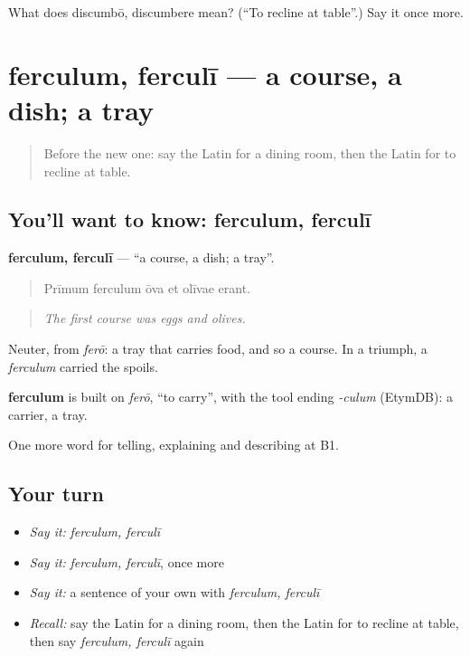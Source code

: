 \begin{tcolorbox}[breakable,colback=teal!4,colframe=teal!35!black,title={Before you move on}]
What does discumbō, discumbere mean? (\textquotedblleft{}To recline at table\textquotedblright{}.) Say it once more.
\end{tcolorbox}
\section[ferculum, ferculī]{ferculum, ferculī — a course, a dish; a tray}

\label{lesson:LA-C356-ferculum}



\begin{quote}
Before the new one: say the Latin for a dining room, then the Latin for to recline at table.
\end{quote}

\subsection*{You'll want to know: ferculum, ferculī}
\textbf{ferculum, ferculī} — \textquotedblleft{}a course, a dish; a tray\textquotedblright{}.

\begin{quote}
Prīmum ferculum ōva et olīvae erant.
\end{quote}

\begin{quote}
\emph{The first course was eggs and olives.}
\end{quote}

Neuter, from \emph{ferō}: a tray that carries food, and so a course. In a triumph, a \emph{ferculum} carried the spoils.

\begin{cousinweb}
\textbf{ferculum} is built on \emph{ferō}, \textquotedblleft{}to carry\textquotedblright{}, with the tool ending \emph{-culum} (EtymDB): a carrier, a tray.
\end{cousinweb}

\begin{grammarlens}[title={What you've built}]
One more word for telling, explaining and describing at B1.
\end{grammarlens}

\subsection*{Your turn}
\begin{itemize}
\raggedright
  \item \emph{Say it:} \emph{ferculum, ferculī}
  \item \emph{Say it:} \emph{ferculum, ferculī}, once more
  \item \emph{Say it:} a sentence of your own with \emph{ferculum, ferculī}
  \item \emph{Recall:} say the Latin for a dining room, then the Latin for to recline at table, then say \emph{ferculum, ferculī} again
\end{itemize}

